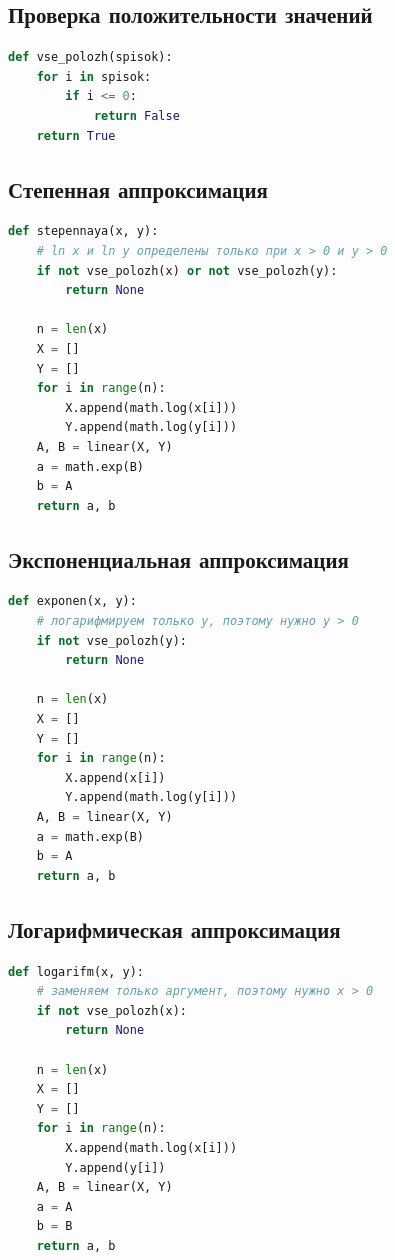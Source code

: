 \documentclass[12pt,a4paper]{article}
\begin{document}
\subsection*{Проверка положительности значений}
\begin{lstlisting}[language=Python,caption={Функция \texttt{vse\_polozh}}]
def vse_polozh(spisok):
    for i in spisok:
        if i <= 0:
            return False
    return True
\end{lstlisting}

\subsection*{Степенная аппроксимация}
\begin{lstlisting}[language=Python,caption={Функция \texttt{stepennaya}}]
def stepennaya(x, y):
    # ln x и ln y определены только при x > 0 и y > 0
    if not vse_polozh(x) or not vse_polozh(y):
        return None

    n = len(x)
    X = []
    Y = []
    for i in range(n):
        X.append(math.log(x[i]))
        Y.append(math.log(y[i]))
    A, B = linear(X, Y)
    a = math.exp(B)
    b = A
    return a, b
\end{lstlisting}

\subsection*{Экспоненциальная аппроксимация}
\begin{lstlisting}[language=Python,caption={Функция \texttt{exponen}}]
def exponen(x, y):
    # логарифмируем только y, поэтому нужно y > 0
    if not vse_polozh(y):
        return None

    n = len(x)
    X = []
    Y = []
    for i in range(n):
        X.append(x[i])
        Y.append(math.log(y[i]))
    A, B = linear(X, Y)
    a = math.exp(B)
    b = A
    return a, b
\end{lstlisting}

\subsection*{Логарифмическая аппроксимация}
\begin{lstlisting}[language=Python,caption={Функция \texttt{logarifm}}]
def logarifm(x, y):
    # заменяем только аргумент, поэтому нужно x > 0
    if not vse_polozh(x):
        return None

    n = len(x)
    X = []
    Y = []
    for i in range(n):
        X.append(math.log(x[i]))
        Y.append(y[i])
    A, B = linear(X, Y)
    a = A
    b = B
    return a, b
\end{lstlisting}
\end{document}
